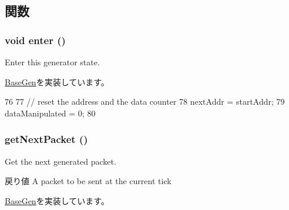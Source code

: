 \subsection{関数}
\hypertarget{classLinearGen_a2759dad6560aaf485b16356d7142d69d}{
\subsubsection[{enter}]{\setlength{\rightskip}{0pt plus 5cm}void enter ()}}
\label{classLinearGen_a2759dad6560aaf485b16356d7142d69d}
Enter this generator state. 

\hyperlink{classBaseGen_ac51895063c53dfbc0f47a01940a3aa05}{BaseGen}を実装しています。


\begin{DoxyCode}
76 {
77     // reset the address and the data counter
78     nextAddr = startAddr;
79     dataManipulated = 0;
80 }
\end{DoxyCode}
\hypertarget{classLinearGen_a938aa9841a9a62a776afbd0768af5379}{
\subsubsection[{getNextPacket}]{ getNextPacket ()}}
\label{classLinearGen_a938aa9841a9a62a776afbd0768af5379}
Get the next generated packet.

\begin{DoxyReturn}{戻り値}
A packet to be sent at the current tick 
\end{DoxyReturn}


\hyperlink{classBaseGen_a6cdb7c977e91dfc33aeea10a3dfcefed}{BaseGen}を実装しています。


